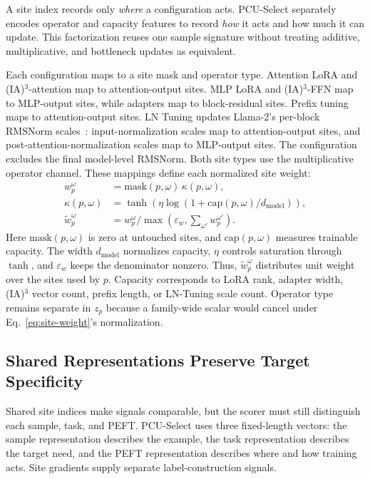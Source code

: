 A site index records only \emph{where} a configuration acts. PCU-Select separately encodes operator and capacity features to record \emph{how} it acts and how much it can update. This factorization reuses one sample signature without treating additive, multiplicative, and bottleneck updates as equivalent.

Each configuration maps to a site mask and operator type. Attention LoRA and (IA)$^3$-attention map to attention-output sites. MLP LoRA and (IA)$^3$-FFN map to MLP-output sites, while adapters map to block-residual sites. Prefix tuning maps to attention-output sites. LN Tuning updates Llama-2's per-block RMSNorm scales~\cite{wang2022lntuning,touvron2023llama2}: input-normalization scales map to attention-output sites, and post-attention-normalization scales map to MLP-output sites. The configuration excludes the final model-level RMSNorm. Both site types use the multiplicative operator channel. These mappings define each normalized site weight:
\begin{equation}
  \begin{aligned}
  w_p^{\omega}
  &=\mathrm{mask}(p,\omega)\,\kappa(p,\omega),\\
  \kappa(p,\omega)
  &=\tanh\!\left(\eta\log(1+\mathrm{cap}(p,\omega)/d_{\mathrm{model}})\right),\\
  \tilde{w}_p^{\omega}
  &=w_p^{\omega}/\max(\varepsilon_w,\sum_{\omega'}w_p^{\omega'}).
  \end{aligned}
  \label{eq:site-weight}
\end{equation}
Here $\mathrm{mask}(p,\omega)$ is zero at untouched sites, and $\mathrm{cap}(p,\omega)$ measures trainable capacity. The width $d_{\mathrm{model}}$ normalizes capacity, $\eta$ controls saturation through $\tanh$, and $\varepsilon_w$ keeps the denominator nonzero. Thus, $\tilde{w}_p^{\omega}$ distributes unit weight over the sites used by $p$. Capacity corresponds to LoRA rank, adapter width, (IA)$^3$ vector count, prefix length, or LN-Tuning scale count. Operator type remains separate in $z_p$ because a family-wide scalar would cancel under Eq.~\eqref{eq:site-weight}'s normalization.

\subsection{Shared Representations Preserve Target Specificity}

Shared site indices make signals comparable, but the scorer must still distinguish each sample, task, and PEFT. PCU-Select uses three fixed-length vectors: the sample representation describes the example, the task representation describes the target need, and the PEFT representation describes where and how training acts. Site gradients supply separate label-construction signals.

